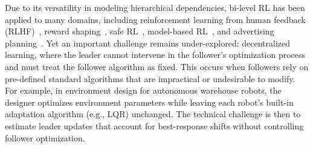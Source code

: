 \documentclass[letterpaper]{article} %
\begin{document}

Due to its versatility in modeling hierarchical dependencies, bi-level RL has been applied to many domains, including reinforcement learning from human feedback (RLHF)~\citep{Chakraborty2023-gw,Shen2024-ma,Yang2025-lr}, reward shaping~\citep{Shen2024-ma,Yang2025-lr}, safe RL~\citep{Zhi2025-s}, model-based RL~\citep{Rajeswaran2020-gv}, and advertising planning~\citep{Muneeb2019-no}. 
Yet an important challenge remains under-explored: decentralized learning, where the leader cannot intervene in the follower's optimization process and must treat the follower algorithm as fixed.
This occurs when followers rely on pre-defined standard algorithms that are impractical or undesirable to modify. 
For example, in environment design for autonomous warehouse robots, the designer optimizes environment parameters while leaving each robot's built-in adaptation algorithm (e.g., LQR) unchanged.
The technical challenge is then to estimate leader updates that account for best-response shifts without controlling follower optimization.
\end{document}
